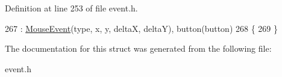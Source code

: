 Definition at line 253 of file event.\+h.


\begin{DoxyCode}
267         : \hyperlink{classMouseEvent_a38e3202976fe08a74713bbb3326004c6}{MouseEvent}(type, x, y, deltaX, deltaY), button(button)
268         \{
269         \}
\end{DoxyCode}


The documentation for this struct was generated from the following file\+:\begin{DoxyCompactItemize}
\item 
event.\+h\end{DoxyCompactItemize}
